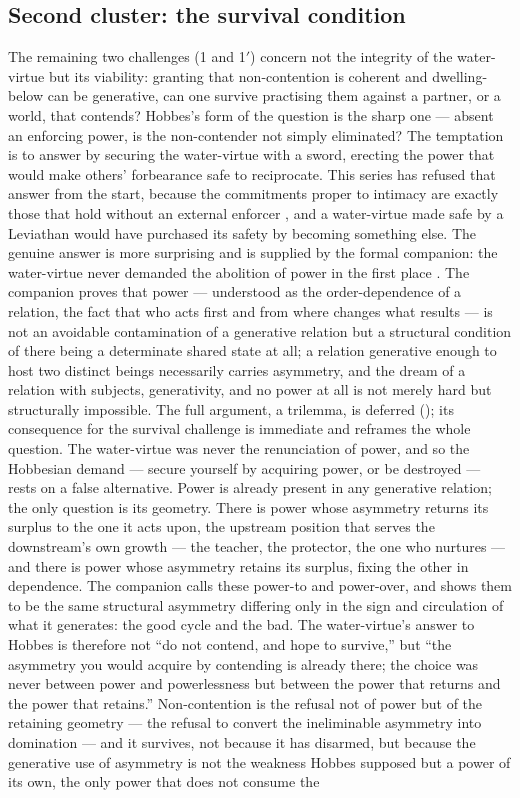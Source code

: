 \subsection{Second cluster: the survival condition}
\label{p20:sub:dialectic-survival}

The remaining two challenges (1 and 1$'$) concern not the integrity of the water-virtue but its viability: granting that non-contention is coherent and dwelling-below can be generative, can one survive practising them against a partner, or a world, that contends? Hobbes's form of the question is the sharp one --- absent an enforcing power, is the non-contender not simply eliminated? The temptation is to answer by securing the water-virtue with a sword, erecting the power that would make others' forbearance safe to reciprocate. This series has refused that answer from the start, because the commitments proper to intimacy are exactly those that hold without an external enforcer \parencite{paperxiii}, and a water-virtue made safe by a Leviathan would have purchased its safety by becoming something else. The genuine answer is more surprising and is supplied by the formal companion: the water-virtue never demanded the abolition of power in the first place \parencite{wan2026braid}. The companion proves that power --- understood as the order-dependence of a relation, the fact that who acts first and from where changes what results --- is not an avoidable contamination of a generative relation but a structural condition of there being a determinate shared state at all; a relation generative enough to host two distinct beings necessarily carries asymmetry, and the dream of a relation with subjects, generativity, and no power at all is not merely hard but structurally impossible. The full argument, a trilemma, is deferred (); its consequence for the survival challenge is immediate and reframes the whole question. The water-virtue was never the renunciation of power, and so the Hobbesian demand --- secure yourself by acquiring power, or be destroyed --- rests on a false alternative. Power is already present in any generative relation; the only question is its geometry. There is power whose asymmetry returns its surplus to the one it acts upon, the upstream position that serves the downstream's own growth --- the teacher, the protector, the one who nurtures --- and there is power whose asymmetry retains its surplus, fixing the other in dependence. The companion calls these power-to and power-over, and shows them to be the same structural asymmetry differing only in the sign and circulation of what it generates: the good cycle and the bad. The water-virtue's answer to Hobbes is therefore not ``do not contend, and hope to survive,'' but ``the asymmetry you would acquire by contending is already there; the choice was never between power and powerlessness but between the power that returns and the power that retains.'' Non-contention is the refusal not of power but of the retaining geometry --- the refusal to convert the ineliminable asymmetry into domination --- and it survives, not because it has disarmed, but because the generative use of asymmetry is not the weakness Hobbes supposed but a power of its own, the only power that does not consume the 
